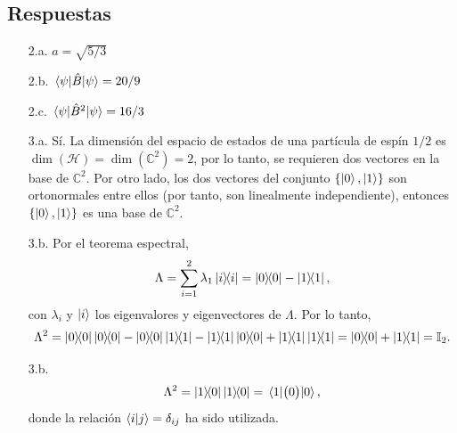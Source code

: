 \documentclass[11pt,letterpaper]{article}
\begin{document}
\subsection*{Respuestas}
\begin{enumerate}
\item[2.a.] $a=\sqrt{5/3}$
\item[2.b.] $\matrixel{\psi}{\hat B}{\psi}=20/9$
\item[2.c.] $\matrixel{\psi}{\hat B^2}{\psi}=16/3$

\item[3.a.] Sí. La dimensión del espacio de estados de una partícula de espín $1/2$
es $\dim (\mathcal{H})=\dim(\mathbb{C}^2)=2$, por lo tanto, se requieren dos vectores
en la base de $\mathbb{C}^2$. Por otro lado, los dos vectores del conjunto 
$\{ \ket{0}, \ket{1}\}$ son ortonormales entre ellos (por tanto, son linealmente
independiente), entonces $\{ \ket{0}, \ket{1}\}$ es una base de $\mathbb{C}^2$. 
\item[3.b.] Por el teorema espectral, 
\begin{align}
\Lambda=\sum_{i=1}^2\lambda_1\dyad{i}{i}=\dyad{0}{0}-\dyad{1}{1},
\end{align}
con $\lambda_i$ y $\ket{i}$ los eigenvalores y eigenvectores de $\Lambda$. Por lo tanto,
\begin{align}
\Lambda^2=\dyad{0}{0}\dyad{0}{0}-\dyad{0}{0}\dyad{1}{1}-\dyad{1}{1}\dyad{0}{0}
+\dyad{1}{1}\dyad{1}{1}=\dyad{0}{0}+\dyad{1}{1}=\mathbb{I}_2.
\end{align}
\item[3.b.] 
\begin{align}
\Lambda^2=\dyad{1}{0}\dyad{1}{0}=\matrixel{1}{\big(0 \big)}{0},
\end{align}
donde la relación $\braket{i}{j}=\delta_{ij}$ ha sido utilizada.
\end{enumerate}
\end{document}
